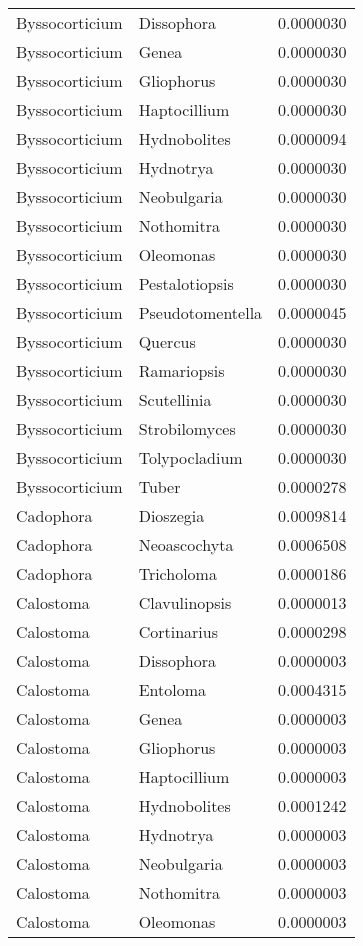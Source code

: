 \documentclass[border=1mm]{standalone}
\begin{document}
\begin{longtable}[t]{lll}
Byssocorticium & Dissophora & 0.0000030\\
\addlinespace
Byssocorticium & Genea & 0.0000030\\
Byssocorticium & Gliophorus & 0.0000030\\
Byssocorticium & Haptocillium & 0.0000030\\
Byssocorticium & Hydnobolites & 0.0000094\\
Byssocorticium & Hydnotrya & 0.0000030\\
\addlinespace
Byssocorticium & Neobulgaria & 0.0000030\\
Byssocorticium & Nothomitra & 0.0000030\\
Byssocorticium & Oleomonas & 0.0000030\\
Byssocorticium & Pestalotiopsis & 0.0000030\\
Byssocorticium & Pseudotomentella & 0.0000045\\
\addlinespace
Byssocorticium & Quercus & 0.0000030\\
Byssocorticium & Ramariopsis & 0.0000030\\
Byssocorticium & Scutellinia & 0.0000030\\
Byssocorticium & Strobilomyces & 0.0000030\\
Byssocorticium & Tolypocladium & 0.0000030\\
\addlinespace
Byssocorticium & Tuber & 0.0000278\\
Cadophora & Dioszegia & 0.0009814\\
Cadophora & Neoascochyta & 0.0006508\\
Cadophora & Tricholoma & 0.0000186\\
Calostoma & Clavulinopsis & 0.0000013\\
\addlinespace
Calostoma & Cortinarius & 0.0000298\\
Calostoma & Dissophora & 0.0000003\\
Calostoma & Entoloma & 0.0004315\\
Calostoma & Genea & 0.0000003\\
Calostoma & Gliophorus & 0.0000003\\
\addlinespace
Calostoma & Haptocillium & 0.0000003\\
Calostoma & Hydnobolites & 0.0001242\\
Calostoma & Hydnotrya & 0.0000003\\
Calostoma & Neobulgaria & 0.0000003\\
Calostoma & Nothomitra & 0.0000003\\
\addlinespace
Calostoma & Oleomonas & 0.0000003\\

\end{longtable}
\end{document}
